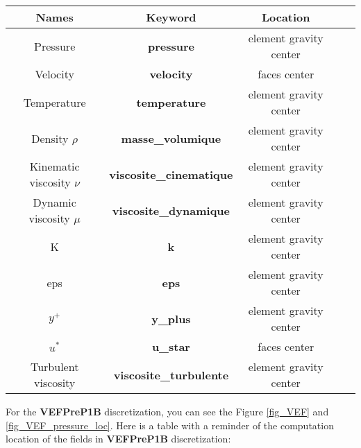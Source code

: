 \begin{longtable}[h!]{|c|c|c|c|c|}
\hline 
\textbf{Names}              & \textbf{Keyword}                  & \textbf{Location}     \\ \hline
\hline
Pressure                    & \textbf{pressure}                 & element gravity center    \\ \hline
Velocity                    & \textbf{velocity}                 & faces center              \\ \hline
Temperature                 & \textbf{temperature}              & element gravity center    \\ \hline
\hline
Density $\rho$              & \textbf{masse\_volumique}         & element gravity center    \\ \hline
Kinematic viscosity $\nu$   & \textbf{viscosite\_cinematique}   & element gravity center    \\ \hline
Dynamic viscosity $\mu$     & \textbf{viscosite\_dynamique}     & element gravity center    \\ \hline
\hline
K                           & \textbf{k}                        & element gravity center    \\ \hline
eps                         & \textbf{eps}                      & element gravity center    \\ \hline
$y^+$                       & \textbf{y\_plus}                  & element gravity center    \\ \hline
$u^*$                       & \textbf{u\_star}                  & faces center              \\ \hline
Turbulent viscosity         & \textbf{viscosite\_turbulente}    & element gravity center    \\ \hline
\end{longtable}


For the \textbf{VEFPreP1B} discretization, you can see the Figure \ref{fig_VEF} and \ref{fig_VEF_pressure_loc}. Here is a table with a reminder of the computation location of the fields in \textbf{VEFPreP1B} discretization:

